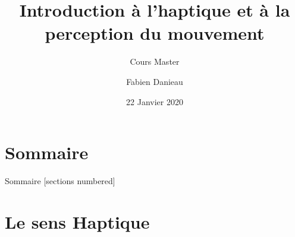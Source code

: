 \documentclass[compress, noflama]{beamer}
\title{Introduction à l'haptique et à la perception du mouvement}
\subtitle{Cours Master}
\date{22 Janvier 2020}%
\author{Fabien Danieau}
\institute{InterDigital - Immersive Media Lab\\ \href{mailto:fabien.danieau@interdigital.com}{fabien.danieau@interdigital.com}}
\begin{document}

\maketitle


\section*{Sommaire}
\begin{frame}{Sommaire}
	[sections numbered]
	\tableofcontents[hideallsubsections]
\end{frame}


\section{Le sens Haptique}
\end{document}
